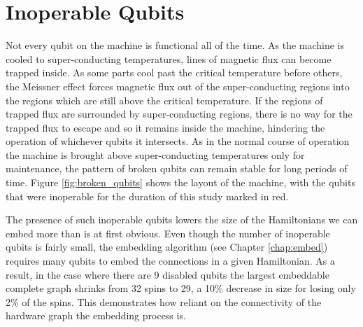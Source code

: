 \section{Inoperable Qubits}
\label{sec:inop_qubits}
Not every qubit on the \machine machine is functional all of the time.  As the machine is cooled to super-conducting temperatures, lines of magnetic flux can become trapped inside.  As some parts cool past the critical temperature before others, the Meissner effect forces magnetic flux out of the super-conducting regions into the regions which are still above the critical temperature.  If the regions of trapped flux are surrounded by super-conducting regions, there is no way for the trapped flux to escape and so it remains inside the machine, hindering the operation of whichever qubits it intersects.  As in the normal course of operation the machine is brought above super-conducting temperatures only for maintenance, the pattern of broken qubits can remain stable for long periods of time.  Figure \ref{fig:broken_qubits} shows the layout of the \machine machine, with the qubits that were inoperable for the duration of this study marked in red.

The presence of such inoperable qubits lowers the size of the Hamiltonians we can embed more than is at first obvious.  Even though the number of inoperable qubits is fairly small, the embedding algorithm (see Chapter \ref{chap:embed}) requires many qubits to embed the connections in a given Hamiltonian.  As a result, in the case where there are 9 disabled qubits the largest embeddable complete graph shrinks from 32 spins to 29, a 10\% decrease in size for losing only 2\% of the spins.  This demonstrates how reliant on the connectivity of the hardware graph the embedding process is.

